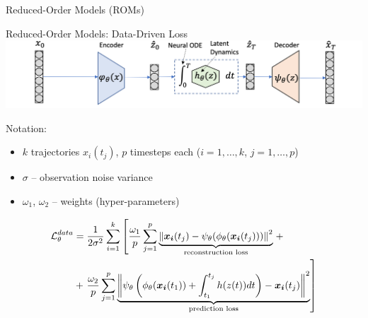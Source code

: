 \documentclass[8pt]{beamer}
\begin{document}
\begin{frame}{Reduced-Order Models (ROMs)}
\end{frame}

\begin{frame}{Reduced-Order Models: Data-Driven Loss}
\includegraphics[width=\textwidth]{Figures/just_rom.png}
\vspace{0.5em}

Notation:
\begin{itemize}
	\item $k$ trajectories $x_i(t_j)$, $p$ timesteps each ($i = 1, \dots, k$, $j = 1, \dots, p$)
	\item $\sigma$ -- observation noise variance
	\item $\omega_1$, $\omega_2$ -- weights (hyper-parameters) 
\end{itemize}

\begin{align}
    \operatorname{\mathcal{L}}^{data}_\theta & = \frac{1}{2\sigma^2}\sum_{i = 1}^k \left[\frac{\omega_1}{p}\sum_{j=1}^p\underbrace{\left\|\boldsymbol{x_i}(t_j) - \psi_\theta(\phi_\theta(\boldsymbol{x_i}(t_j)))\right\|^2}_{\text{reconstruction loss}}\right. + \\
     & + \left.\frac{\omega_2}{p}\sum_{j=1}^p \underbrace{\left\|\psi_\theta\left(\phi_\theta(\boldsymbol{x_i}(t_1)) + \int_{t_1}^{t_j}h(z(t))dt\right) - \boldsymbol{x_i}(t_j)\right\|^2}_{\text{prediction loss}} \right]
\end{align}

\end{frame}
\end{document}
